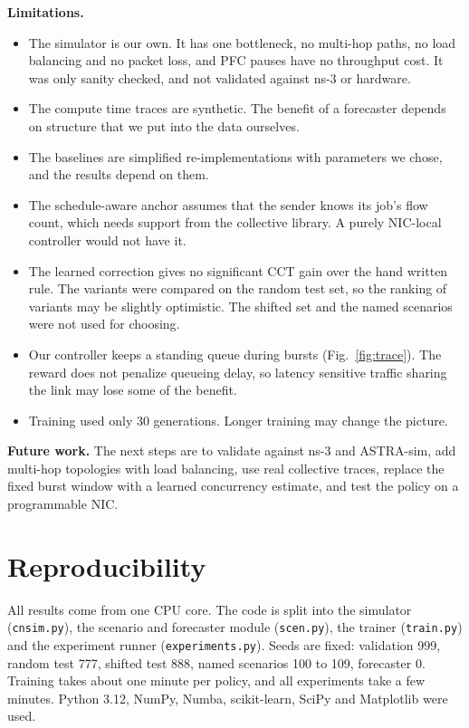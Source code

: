 \documentclass[conference]{IEEEtran}
\begin{document}
\textbf{Limitations.}
\begin{itemize}
\item The simulator is our own. It has one bottleneck, no multi-hop paths, no load balancing and no packet loss, and PFC pauses have no throughput cost. It was only sanity checked, and not validated against ns-3 or hardware.
\item The compute time traces are synthetic. The benefit of a forecaster depends on structure that we put into the data ourselves.
\item The baselines are simplified re-implementations with parameters we chose, and the results depend on them.
\item The schedule-aware anchor assumes that the sender knows its job's flow count, which needs support from the collective library. A purely NIC-local controller would not have it.
\item The learned correction gives no significant CCT gain over the hand written rule. The variants were compared on the random test set, so the ranking of variants may be slightly optimistic. The shifted set and the named scenarios were not used for choosing.
\item Our controller keeps a standing queue during bursts (Fig.~\ref{fig:trace}). The reward does not penalize queueing delay, so latency sensitive traffic sharing the link may lose some of the benefit.
\item Training used only 30 generations. Longer training may change the picture.
\end{itemize}

\textbf{Future work.} The next steps are to validate against ns-3 and ASTRA-sim, add multi-hop topologies with load balancing, use real collective traces, replace the fixed burst window with a learned concurrency estimate, and test the policy on a programmable NIC.

\section{Reproducibility}
All results come from one CPU core. The code is split into the simulator (\texttt{cnsim.py}), the scenario and forecaster module (\texttt{scen.py}), the trainer (\texttt{train.py}) and the experiment runner (\texttt{experiments.py}). Seeds are fixed: validation 999, random test 777, shifted test 888, named scenarios 100 to 109, forecaster 0. Training takes about one minute per policy, and all experiments take a few minutes. Python 3.12, NumPy, Numba, scikit-learn, SciPy and Matplotlib were used.
\end{document}
